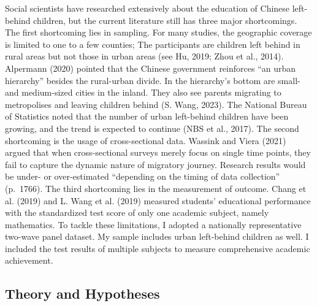 \documentclass[
  man,floatsintext]{apa7}
\begin{document}
Social scientists have researched extensively about the education of Chinese left-behind children, but the current literature still has three major shortcomings. The first shortcoming lies in sampling. For many studies, the geographic coverage is limited to one to a few counties; The participants are children left behind in rural areas but not those in urban areas (see Hu, 2019; Zhou et al., 2014). Alpermann (2020) pointed that the Chinese government reinforces ``an urban hierarchy'' besides the rural-urban divide. In the hierarchy's bottom are small- and medium-sized cities in the inland. They also see parents migrating to metropolises and leaving children behind (S. Wang, 2023). The National Bureau of Statistics noted that the number of urban left-behind children have been growing, and the trend is expected to continue (NBS et al., 2017). The second shortcoming is the usage of cross-sectional data. Wassink and Viera (2021) argued that when cross-sectional surveys merely focus on single time points, they fail to capture the dynamic nature of migratory journey. Research results would be under- or over-estimated ``depending on the timing of data collection'' (p.~1766). The third shortcoming lies in the measurement of outcome. Chang et al. (2019) and L. Wang et al. (2019) measured students' educational performance with the standardized test score of only one academic subject, namely mathematics. To tackle these limitations, I adopted a nationally representative two-wave panel dataset. My sample includes urban left-behind children as well. I included the test results of multiple subjects to measure comprehensive academic achievement.

\hypertarget{theory-and-hypotheses}{%
\subsection{Theory and Hypotheses}\label{theory-and-hypotheses}}
\end{document}
